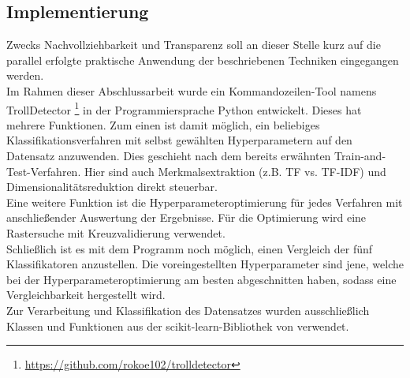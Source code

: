 \subsection{Implementierung} 
Zwecks Nachvollziehbarkeit und Transparenz soll an dieser Stelle kurz auf die parallel erfolgte praktische Anwendung der beschriebenen Techniken eingegangen werden.\\
Im Rahmen dieser Abschlussarbeit wurde ein Kommandozeilen-Tool namens \glqq TrollDetector\grqq{} \footnote{\url{https://github.com/rokoe102/trolldetector}} in der Programmiersprache Python entwickelt. Dieses hat mehrere Funktionen. Zum einen ist damit möglich, ein beliebiges Klassifikationsverfahren mit selbst gewählten Hyperparametern auf den Datensatz anzuwenden. Dies geschieht nach dem bereits erwähnten \glqq Train-and-Test\grqq-Verfahren. Hier sind auch Merkmalsextraktion (z.B. TF vs. TF-IDF) und Dimensionalitätsreduktion direkt steuerbar.\\
Eine weitere Funktion ist die Hyperparameteroptimierung für jedes Verfahren mit anschließender Auswertung der Ergebnisse. Für die Optimierung wird eine Rastersuche mit Kreuzvalidierung verwendet.\\
Schließlich ist es mit dem Programm noch möglich, einen Vergleich der fünf Klassifikatoren anzustellen. Die voreingestellten Hyperparameter sind jene, welche bei der Hyperparameteroptimierung am besten abgeschnitten haben, sodass eine Vergleichbarkeit hergestellt wird.\\
Zur Verarbeitung und Klassifikation des Datensatzes wurden ausschließlich Klassen und Funktionen aus der \glqq scikit-learn\grqq-Bibliothek von \citet{scikit-learn} verwendet.\\
\pagebreak